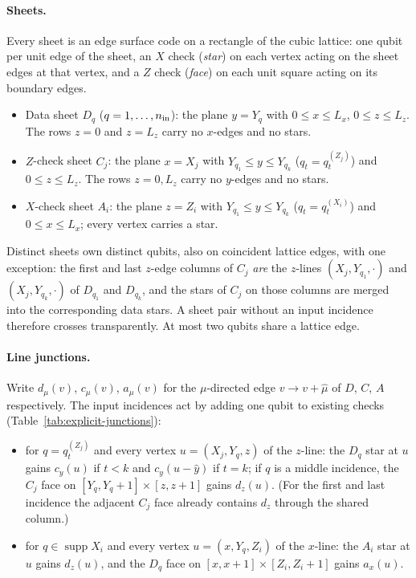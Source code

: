 \documentclass[aps,prx,reprint,superscriptaddress,nofootinbib,floatfix,longbibliography]{revtex4-2}
\theoremstyle{definition}
\begin{document}
\paragraph{Sheets.}
Every sheet is an edge surface code on a rectangle of the cubic lattice: one
qubit per unit edge of the sheet, an $X$ check (\emph{star}) on each vertex
acting on the sheet edges at that vertex, and a $Z$ check (\emph{face}) on
each unit square acting on its boundary edges.
\begin{itemize}
\item Data sheet $D_q$ ($q=1,\dots,n_{\rm in}$): the plane $y=Y_q$ with
$0\le x\le L_x$, $0\le z\le L_z$.  The rows $z=0$ and $z=L_z$ carry no
$x$-edges and no stars.
\item $Z$-check sheet $C_j$: the plane $x=X_j$ with
$Y_{q_1}\le y\le Y_{q_k}$ ($q_t=q_t^{(Z_j)}$) and $0\le z\le L_z$.  The rows
$z=0,L_z$ carry no $y$-edges and no stars.
\item $X$-check sheet $A_i$: the plane $z=Z_i$ with
$Y_{q_1}\le y\le Y_{q_k}$ ($q_t=q_t^{(X_i)}$) and $0\le x\le L_x$; every
vertex carries a star.
\end{itemize}
Distinct sheets own distinct qubits, also on coincident lattice edges, with
one exception: the first and last $z$-edge columns of $C_j$ \emph{are} the
$z$-lines $(X_j,Y_{q_1},\cdot)$ and $(X_j,Y_{q_k},\cdot)$ of $D_{q_1}$ and
$D_{q_k}$, and the stars of $C_j$ on those columns are merged into the
corresponding data stars.  A sheet pair without an input incidence therefore
crosses transparently.  At most two qubits share a lattice edge.

\paragraph{Line junctions.}
Write $d_\mu(v)$, $c_\mu(v)$, $a_\mu(v)$ for the $\mu$-directed edge
$v\to v+\hat\mu$ of $D$, $C$, $A$ respectively.  The input incidences act by
adding one qubit to existing checks (Table~\ref{tab:explicit-junctions}):
\begin{itemize}
\item[(Z)] for $q=q_t^{(Z_j)}$ and every vertex $u=(X_j,Y_q,z)$ of the
$z$-line: the $D_q$ star at $u$ gains $c_y(u)$ if $t<k$ and $c_y(u-\hat y)$ if
$t=k$; if $q$ is a middle incidence, the $C_j$ face on
$[Y_q,Y_q+1]\times[z,z+1]$ gains $d_z(u)$.  (For the first and last incidence
the adjacent $C_j$ face already contains $d_z$ through the shared column.)
\item[(X)] for $q\in\operatorname{supp}X_i$ and every vertex
$u=(x,Y_q,Z_i)$ of the $x$-line: the $A_i$ star at $u$ gains $d_z(u)$, and the
$D_q$ face on $[x,x+1]\times[Z_i,Z_i+1]$ gains $a_x(u)$.
\end{itemize}
\end{document}
